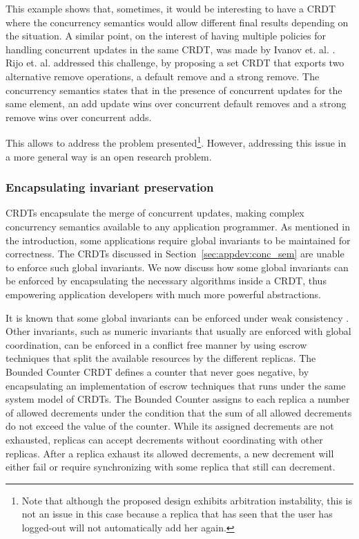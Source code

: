 \documentclass[11pt,a4paper]{article}
\begin{document}
This example shows that, sometimes, it would be interesting to have 
a CRDT where the concurrency semantics would allow different final results
depending on the situation. 
A similar point, on the interest of having multiple policies for handling concurrent 
updates in the same CRDT, was made by Ivanov et. al. \cite{ivanov}.
Rijo et. al. \cite{addremovewins} addressed this challenge, by proposing 
a set CRDT that exports two alternative remove operations, a default 
remove and a strong remove.
The concurrency semantics states that in the presence of concurrent updates
for the same element, an add update wins over concurrent default removes and 
a strong remove wins over concurrent adds. 

This allows to address the problem presented\footnote{Note that although the 
proposed design exhibits arbitration instability, this is not an issue in this
case because a replica that has seen that the user has logged-out will 
not automatically add her again.}.
However, addressing this issue in a more general way is an open research problem.


\subsubsection{Encapsulating invariant preservation} 

CRDTs encapsulate the merge of concurrent updates, making complex concurrency
semantics available to any application programmer.
As mentioned in the introduction, some applications require global invariants
to be maintained for correctness.
The CRDTs discussed in Section~\ref{sec:appdev:conc_sem} are unable to enforce
such global invariants.
We now discuss how some global invariants can be enforced by encapsulating the
necessary algorithms inside a CRDT, 
thus empowering application developers with much more powerful abstractions.

It is known that some global invariants can be enforced under weak 
consistency \cite{Bailis14Coordination}.
Other invariants, such as numeric invariants that usually are enforced with 
global coordination, can be enforced in a conflict free manner by using 
escrow techniques \cite{ONeil86Escrow} that split the available resources
by the different replicas.  
The Bounded Counter CRDT \cite{DBLP:conf/srds/BalegasSDFSRP15} defines a counter that never goes 
negative, by encapsulating an implementation of escrow techniques that
runs under the same system model of CRDTs. 
The Bounded Counter assigns to each replica a number of allowed decrements under the condition that 
the sum of all allowed decrements do not exceed the value of the counter.
While its assigned decrements are not exhausted, replicas can accept decrements without coordinating
with other replicas.
After a replica exhaust its allowed decrements, a new decrement will either fail or require synchronizing 
with some replica that still can decrement.
\end{document}
